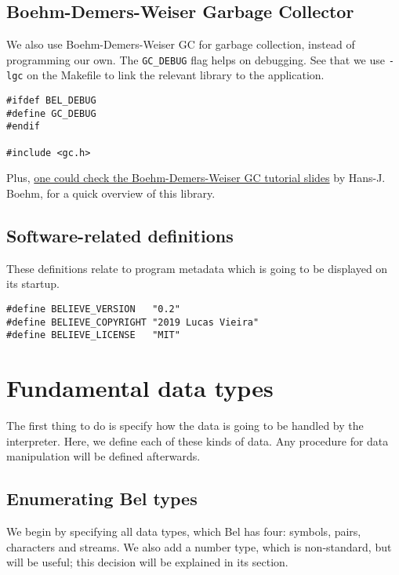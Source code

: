 \documentclass[openright,a4paper,twoside,12pt]{memoir}
\begin{document}
\section{Boehm-Demers-Weiser Garbage Collector}
\label{sec:org33668bd}

We also use Boehm-Demers-Weiser GC for garbage collection, instead of
programming our own. The \texttt{GC\_DEBUG} flag helps on debugging. See that we
use \texttt{-lgc} on the Makefile to link the relevant library to the
application.

\begin{verbatim}
#ifdef BEL_DEBUG
#define GC_DEBUG
#endif

#include <gc.h>
\end{verbatim}

Plus, \href{https://www.hboehm.info/gc/04tutorial.pdf}{one could check the Boehm-Demers-Weiser GC tutorial slides} by
Hans-J. Boehm, for a quick overview of this library.

\section{Software-related definitions}
\label{sec:org5cc80d3}

These definitions relate to program metadata which is going to be
displayed on its startup.

\begin{verbatim}
#define BELIEVE_VERSION   "0.2"
#define BELIEVE_COPYRIGHT "2019 Lucas Vieira"
#define BELIEVE_LICENSE   "MIT"
\end{verbatim}

\chapter{Fundamental data types}
\label{sec:orge74411f}

The first thing to do is specify how the data is going to be handled
by the interpreter. Here, we define each of these kinds of data. Any
procedure for data manipulation will be defined afterwards.

\section{Enumerating Bel types}
\label{sec:orge7e2240}

We begin by specifying all data types, which Bel has four: symbols,
pairs, characters and streams. We also add a number type, which is
non-standard, but will be useful; this decision will be explained in
its section.
\end{document}
